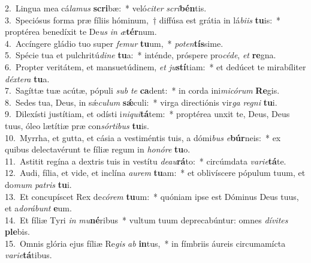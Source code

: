 {2.~}Lingua mea cá\textit{la}\textit{mus} \textbf{scri}bæ:~* veló\textit{ci}\textit{ter} \textit{scri}\textbf{bén}tis.\\
{3.~}Speciósus forma præ fíliis hóminum,~† diffúsa est grátia in lá\textit{bi}\textit{is} \textbf{tu}is:~* proptérea benedíxit te De\textit{us} \textit{in} \textit{æ}\textbf{tér}num.\\
{4.~}Accíngere gládio tuo super \textit{fe}\textit{mur} \textbf{tu}um,~* \textit{po}\textit{ten}\textbf{tís}sime.\\
{5.~}Spécie tua et pulchritú\textit{di}\textit{ne} \textbf{tu}a:~* inténde, próspere pro\textit{cé}\textit{de}, \textit{et} \textbf{re}gna.\\
{6.~}Propter veritátem, et mansuetúdinem, \textit{et} \textit{ju}\textbf{stí}tiam:~* et dedúcet te mirabíliter \textit{déx}\textit{te}\textit{ra} \textbf{tu}a.\\
{7.~}Sagíttæ tuæ acútæ, pópuli \textit{sub} \textit{te} \textbf{ca}dent:~* in corda ini\textit{mi}\textit{có}\textit{rum} \textbf{Re}gis.\\
{8.~}Sedes tua, Deus, in sǽ\textit{cu}\textit{lum} \textbf{sǽ}culi:~* virga directiónis vir\textit{ga} \textit{re}\textit{gni} \textbf{tu}i.\\
{9.~}Dilexísti justítiam, et odísti i\textit{ni}\textit{qui}\textbf{tá}tem:~* proptérea unxit te, Deus, Deus tuus, óleo lætítiæ præ con\textit{sór}\textit{ti}\textit{bus} \textbf{tu}is.\\
{10.~}Myrrha, et gutta, et cásia a vestiméntis tuis, a dómi\textit{bus} \textit{e}\textbf{búr}neis:~* ex quibus delectavérunt te fíliæ regum in \textit{ho}\textit{nó}\textit{re} \textbf{tu}o.\\
{11.~}Astitit regína a dextris tuis in vestítu \textit{de}\textit{au}\textbf{rá}to:~* circúmdata \textit{va}\textit{ri}\textit{e}\textbf{tá}te.\\
{12.~}Audi, fília, et vide, et inclína \textit{au}\textit{rem} \textbf{tu}am:~* et oblivíscere pópulum tuum, et do\textit{mum} \textit{pa}\textit{tris} \textbf{tu}i.\\
{13.~}Et concupíscet Rex de\textit{có}\textit{rem} \textbf{tu}um:~* quóniam ipse est Dóminus Deus tuus, et a\textit{do}\textit{rá}\textit{bunt} \textbf{e}um.\\
{14.~}Et fíliæ Tyri \textit{in} \textit{mu}\textbf{né}ribus~* vultum tuum deprecabúntur: omnes \textit{dí}\textit{vi}\textit{tes} \textbf{ple}bis.\\
{15.~}Omnis glória ejus fíliæ Re\textit{gis} \textit{ab} \textbf{in}tus,~* in fímbriis áureis circumamícta \textit{va}\textit{ri}\textit{e}\textbf{tá}tibus.\\
